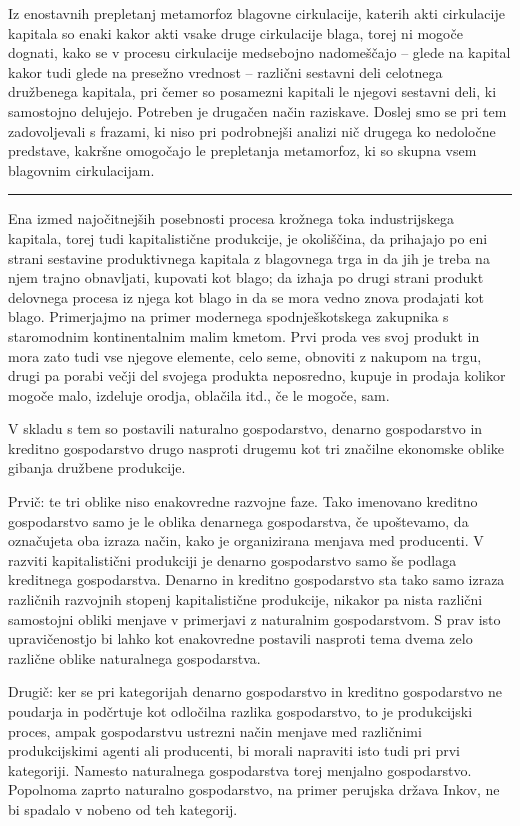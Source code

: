 \documentclass[kapital_02.tex]{subfiles}
\begin{document}
Iz enostavnih prepletanj metamorfoz blagovne cirkulacije, katerih akti cirkulacije kapitala so enaki kakor akti vsake druge cirkulacije blaga, torej ni mogoče dognati, kako se v procesu cirkulacije medsebojno nadomeščajo -- glede na kapital kakor tudi glede na presežno vrednost -- različni sestavni deli celotnega družbenega kapitala, pri čemer so posamezni kapitali le njegovi sestavni deli, ki samostojno delujejo. Potreben je drugačen način raziskave. Doslej smo se pri tem zadovoljevali s frazami, ki niso pri podrobnejši analizi nič drugega ko nedoločne predstave, kakršne omogočajo le prepletanja metamorfoz, ki so skupna vsem blagovnim cirkulacijam.
\medskip
\hrule
\medskip

Ena izmed najočitnejših posebnosti procesa krožnega toka industrijskega kapitala, torej tudi kapitalistične produkcije, je okoliščina, da prihajajo po eni strani sestavine produktivnega kapitala z blagovnega trga in da jih je treba na njem trajno obnavljati, kupovati kot blago; da izhaja po drugi strani produkt delovnega procesa iz njega kot blago in da se mora vedno znova prodajati kot blago. Primerjajmo na primer modernega spodnješkotskega zakupnika s staromodnim kontinentalnim malim kmetom. Prvi proda ves svoj produkt in mora zato tudi vse njegove elemente, celo seme, obnoviti z nakupom na trgu, drugi pa porabi večji del svojega produkta neposredno, kupuje in prodaja kolikor mogoče malo, izdeluje orodja, oblačila itd., če le mogoče, sam.

V \KPEstran skladu s tem so postavili naturalno gospodarstvo, denarno gospodarstvo in kreditno gospodarstvo drugo nasproti drugemu kot tri značilne ekonomske oblike gibanja družbene produkcije.

Prvič: te tri oblike niso enakovredne razvojne faze. Tako imenovano kreditno gospodarstvo samo je le oblika denarnega gospodarstva, če upoštevamo, da označujeta oba izraza način, kako je organizirana menjava med producenti. V razviti kapitalistični produkciji je denarno gospodarstvo samo še podlaga kreditnega gospodarstva. Denarno in kreditno gospodarstvo sta tako samo izraza različnih razvojnih stopenj kapitalistične produkcije, nikakor pa nista različni samostojni obliki menjave v primerjavi z naturalnim gospodarstvom. S prav isto upravičenostjo bi lahko kot enakovredne postavili nasproti tema dvema zelo različne oblike naturalnega gospodarstva.

Drugič: ker se pri kategorijah denarno gospodarstvo in kreditno gospodarstvo ne poudarja in podčrtuje kot odločilna razlika gospodarstvo, to je produkcijski proces, ampak gospodarstvu ustrezni način menjave med različnimi produkcijskimi agenti ali producenti, bi morali napraviti isto tudi pri prvi kategoriji. Namesto naturalnega gospodarstva torej menjalno gospodarstvo. Popolnoma zaprto naturalno gospodarstvo, na primer perujska država Inkov, ne bi spadalo v nobeno od teh kategorij.
\end{document}
